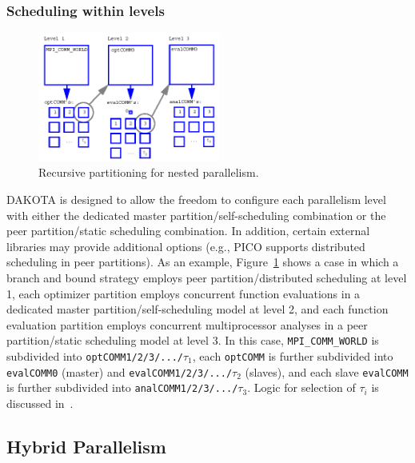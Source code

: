 \subsubsection{Scheduling within levels}\label{parallel:MLP:message:scheduling}

\begin{figure}
  \includegraphics[width=60mm]{images/recursive_partitioning}
  \caption{Recursive partitioning for nested parallelism.}
  \label{parallel:figure02}
\end{figure}

DAKOTA is designed to allow the freedom to configure each parallelism
level with either the dedicated master partition/self-scheduling
combination or the peer partition/static scheduling combination. In
addition, certain external libraries may provide additional options
(e.g., PICO supports distributed scheduling in peer partitions). As an
example, Figure~\ref{parallel:figure02} shows a case in which a branch
and bound strategy employs peer partition/distributed scheduling at
level 1, each optimizer partition employs concurrent function
evaluations in a dedicated master partition/self-scheduling model at
level 2, and each function evaluation partition employs concurrent
multiprocessor analyses in a peer partition/static scheduling model at
level 3. In this case, \texttt{MPI\_COMM\_WORLD} is subdivided into
\texttt{optCOMM1/2/3/.../$\tau_{1}$}, each \texttt{optCOMM} is further
subdivided into \texttt{evalCOMM0} (master) and
\texttt{evalCOMM1/2/3/.../$\tau_{2}$} (slaves), and each slave
\texttt{evalCOMM} is further subdivided into
\texttt{analCOMM1/2/3/.../$\tau_{3}$}.  Logic for selection of $\tau_i$
is discussed in~\cite{Eld00}.


\subsection{Hybrid Parallelism}\label{parallel:MLP:hybrid}

